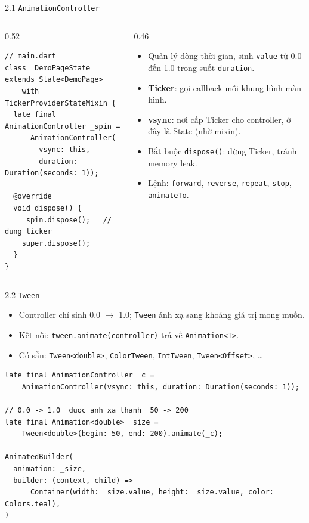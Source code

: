 \documentclass[aspectratio=169,10pt]{beamer}
\begin{document}
\begin{frame}[fragile]{2.1 \texttt{AnimationController}}
  \begin{columns}[T]
  \begin{column}{0.52\textwidth}
\begin{lstlisting}[frame=single,
  basicstyle=\fontfamily{phv}\selectfont\footnotesize]
// main.dart
class _DemoPageState extends State<DemoPage>
    with TickerProviderStateMixin {
  late final AnimationController _spin =
      AnimationController(
        vsync: this,
        duration: Duration(seconds: 1));

  @override
  void dispose() {
    _spin.dispose();   // dung ticker
    super.dispose();
  }
}
\end{lstlisting}
  \end{column}
  \begin{column}{0.46\textwidth}\small
  \begin{itemize}
    \item Quản lý dòng thời gian, sinh \texttt{value} từ 0.0 đến 1.0
          trong suốt \texttt{duration}.
    \item \textbf{Ticker}: gọi callback mỗi khung hình màn hình.
    \item \textbf{vsync}: nơi cấp Ticker cho controller, ở đây là State
          (nhờ mixin).
    \item Bắt buộc \texttt{dispose()}: dừng Ticker, tránh memory leak.
    \item Lệnh: \texttt{forward}, \texttt{reverse}, \texttt{repeat},
          \texttt{stop}, \texttt{animateTo}.
  \end{itemize}
  \end{column}
  \end{columns}
\end{frame}

\begin{frame}[fragile]{2.2 \texttt{Tween}}
  \begin{itemize}
    \item Controller chỉ sinh 0.0 $\rightarrow$ 1.0;
          \texttt{Tween} ánh xạ sang khoảng giá trị mong muốn.
    \item Kết nối: \texttt{tween.animate(controller)} trả về \texttt{Animation<T>}.
    \item Có sẵn: \texttt{Tween<double>}, \texttt{ColorTween}, \texttt{IntTween},
          \texttt{Tween<Offset>}, \dots
  \end{itemize}
\begin{lstlisting}[frame=single,
  basicstyle=\fontfamily{phv}\selectfont\footnotesize]
late final AnimationController _c =
    AnimationController(vsync: this, duration: Duration(seconds: 1));

// 0.0 -> 1.0  duoc anh xa thanh  50 -> 200
late final Animation<double> _size =
    Tween<double>(begin: 50, end: 200).animate(_c);

AnimatedBuilder(
  animation: _size,
  builder: (context, child) =>
      Container(width: _size.value, height: _size.value, color: Colors.teal),
)
\end{lstlisting}
\end{frame}
\end{document}
